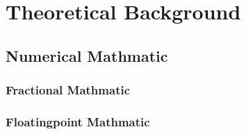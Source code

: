 \chapter{Theoretical Background}
\label{theoretical_background}

\section{Numerical Mathmatic}
\subsection{Fractional Mathmatic}
\subsection{Floatingpoint Mathmatic}